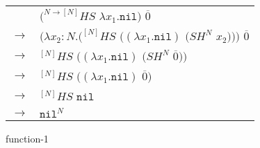 \begin{figure}[h]
\centering
\begin{tabular}{ll}
\vspace{5pt}

& $(^{N\rightarrow[N]}HS$ $\lambda x_{1}.\mathtt{nil})$ $\overline{0}$ \\

\vspace{5pt}

$\rightarrow$ & $(\lambda x_{2}:N.(^{[N]}HS$ $((\lambda x_{1}.\mathtt{nil})$ $(SH^{N}$ $x_{2})))$ $\overline{0}$ \\

\vspace{5pt}

$\rightarrow$ & $^{[N]}HS$ $((\lambda x_{1}.\mathtt{nil})$ $(SH^{N}$ $\overline{0}))$ \\

\vspace{5pt}

$\rightarrow$ & $^{[N]}HS$ $((\lambda x_{1}.\mathtt{nil})$ $\overline{0})$ \\

\vspace{5pt}

$\rightarrow$ & $^{[N]}HS$ $\mathtt{nil}$ \\

\vspace{5pt}

$\rightarrow$ & $\mathtt{nil}^{N}$
\end{tabular}
\caption{function-1}
\label{function-1}
\end{figure}